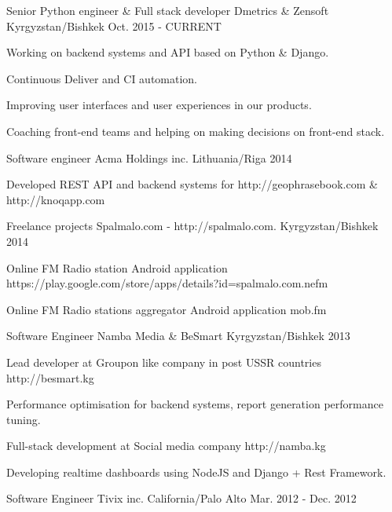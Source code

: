 \begin{cventries}
  \cventry
    {Senior Python engineer \& Full stack developer}
    {Dmetrics \& Zensoft}
    {Kyrgyzstan/Bishkek}
    {Oct. 2015 - CURRENT}
    {
      \begin{cvitems}
        \item {Working on backend systems and API based on Python \& Django.}
        \item {Continuous Deliver and CI automation.}
        \item {Improving user interfaces and user experiences in our products.}
        \item {Coaching front-end teams and helping on making decisions on front-end stack.}
      \end{cvitems}
    }
  \cventry
    {Software engineer}
    {Acma Holdings inc.}
    {Lithuania/Riga}
    {2014}
    {
      \begin{cvitems}
        \item {Developed REST API and backend systems for http://geophrasebook.com \& http://knoqapp.com}
      \end{cvitems}
    }
  \cventry
    {Freelance projects}
    {Spalmalo.com - http://spalmalo.com.}
    {Kyrgyzstan/Bishkek}
    {2014}
    {
      \begin{cvitems}
        \item {Online FM Radio station Android application https://play.google.com/store/apps/details?id=spalmalo.com.nefm}
        \item {Online FM Radio stations aggregator Android application mob.fm}
      \end{cvitems}
    }
  \cventry
    {Software Engineer}
    {Namba Media \& BeSmart}
    {Kyrgyzstan/Bishkek}
    {2013}
    {
      \begin{cvitems}
        \item {Lead developer at Groupon like company in post USSR countries http://besmart.kg}
        \item {Performance optimisation for backend systems, report generation performance tuning.}
        \item {Full-stack development at Social media company http://namba.kg}
        \item {Developing realtime dashboards using NodeJS and Django + Rest Framework.}
      \end{cvitems}
    }
  \cventry
    {Software Engineer}
    {Tivix inc.}
    {California/Palo Alto}
    {Mar. 2012 - Dec. 2012}
    {
      \begin{cvitems}

\end{cvitems}}
\end{cventries}
